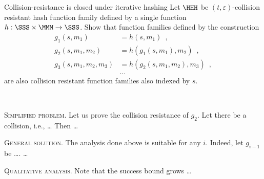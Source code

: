 \documentclass{crypto-exercise}
\author{Sven Laur}
\begin{document}
\begin{exercise}{Collision-resistance is closed under iterative hashing}
Let $\HHH$ be $(t,\varepsilon)$-collision resistant hash function family defined by a single function $h:\SSS\times\MMM\to\SSS$. Show that function families defined by the construction
\begin{align*}
g_1(s, m_1) &= h(s,m_1)\enspace,\\
g_2(s, m_1, m_2)&=h(g_1(s, m_1), m_2)\enspace,\\
g_3(s, m_1, m_2, m_3)&=h(g_2(s, m_1, m_2), m_3)\enspace,\\
&\ldots
\end{align*}
are also collision resistant function families also indexed by $s$.

\end{exercise}
\begin{solution} 
\

\vspace*{2ex}
\noindent
\textsc{Simplified problem.}
Let us prove the collision resistance of $g_2$. Let there be a collision, i.e., \ldots
Then \ldots 


\vspace*{2ex}
\noindent
\textsc{General solution.}
The analysis done above is suitable for any $i$. Indeed, let $g_{i-1}$ be \ldots. 
 \ldots


\vspace*{2ex}
\noindent
\textsc{Qualitative analysis.} Note that the success bound grows \ldots 

\end{solution}
\end{document}
